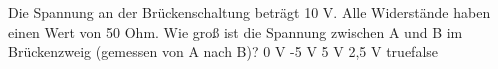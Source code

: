     {Die Spannung an der Brückenschaltung beträgt 10 V. Alle Widerstände haben einen Wert von 50 Ohm. Wie groß ist die Spannung zwischen A und B im Brückenzweig (gemessen von A nach B)?}
    {0 V}
    {-5 V}
    {5 V}
    {2,5 V}
    {true}{false}